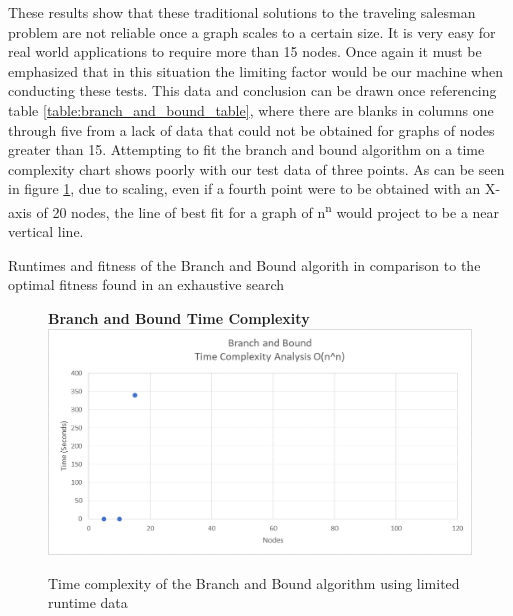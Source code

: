 \documentclass[sigplan,screen]{acmart}
\begin{document}
These results show that these traditional solutions to the traveling salesman
problem are not reliable once a graph scales to a certain size. It is very easy
for real world applications to require more than 15 nodes. Once again it must be
emphasized that in this situation the limiting factor would be our machine when
conducting these tests. This data and conclusion can be drawn once referencing
table \ref{table:branch_and_bound_table}, where there are blanks in columns one
through five from a lack of data that could not be obtained for graphs of nodes
greater than 15. Attempting to fit the branch and bound algorithm on a time
complexity chart shows poorly with our test data of three points. As can be seen
in figure \ref{fig:branch_and_bound_time_complexity}, due to scaling, even if a
fourth point were to be obtained with an X-axis of 20 nodes, the line of best
fit for a graph of n\textsuperscript{n} would project to be a near vertical
line.

\begin{table}[h]
    \setlength\tabcolsep{2pt}
    \centering
    
    \caption{Runtimes and fitness of the Branch and Bound algorith in comparison to the optimal fitness found in an exhaustive search}
    \label{table:branch_and_bound_table}
\end{table}

\begin{figure}[h]
    \centering
    \textbf{Branch and Bound Time Complexity}
    \includegraphics[width=\columnwidth]{assets/branch_and_bound_time_complexity.png}
    \caption{Time complexity of the Branch and Bound algorithm using limited runtime data}
    \label{fig:branch_and_bound_time_complexity}
\end{figure}
\end{document}
